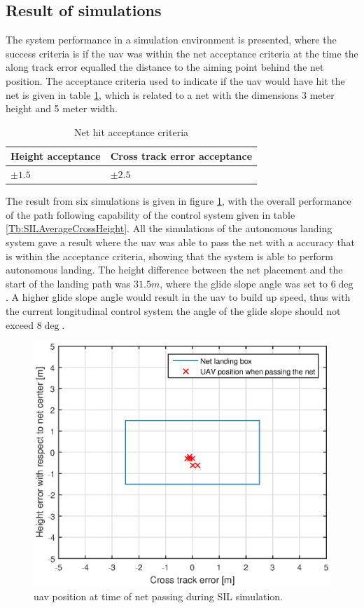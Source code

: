\subsection{Result of simulations}\label{SIL:Results}
The system performance in a simulation environment is presented, where the success criteria is if the \gls{uav} was within the net acceptance criteria at the time the along track error equalled the distance to the aiming point behind the net position. The acceptance criteria used to indicate if the \gls{uav} would have hit the net is given in table \ref{tb:NetCriteria}, which is related to a net with the dimensions 3 meter height and 5 meter width.
\begin{table}[H]
\centering
\begin{tabular}{| l | l |}
\hline
\textbf{Height acceptance}	& \textbf{Cross track error acceptance}	\\ \hline
$\pm1.5$					& $\pm2.5$								\\ \hline
\end{tabular}
\caption{Net hit acceptance criteria}
\label{tb:NetCriteria}
\end{table}
The result from six simulations is given in figure \ref{Fig:SILNetPasing}, with the overall performance of the path following capability of the control system given in table \ref{Tb:SILAverageCrossHeight}. All the simulations of the autonomous landing system gave a result where the \gls{uav} was able to pass the net with a accuracy that is within the acceptance criteria, showing that the system is able to perform autonomous landing. The height difference between the net placement and the start of the landing path was $31.5 m$, where the glide slope angle was set to $6\deg$. A higher glide slope angle would result in the \gls{uav} to build up speed, thus with the current longitudinal control system the angle of the glide slope should not exceed $8\deg$.
\begin{figure}[H]
\centering
\includegraphics[scale=0.7]{figs/SysPlot/SILNetPasing.eps}
\caption{\gls{uav} position at time of net passing during SIL simulation.}
\label{Fig:SILNetPasing}
\end{figure}
